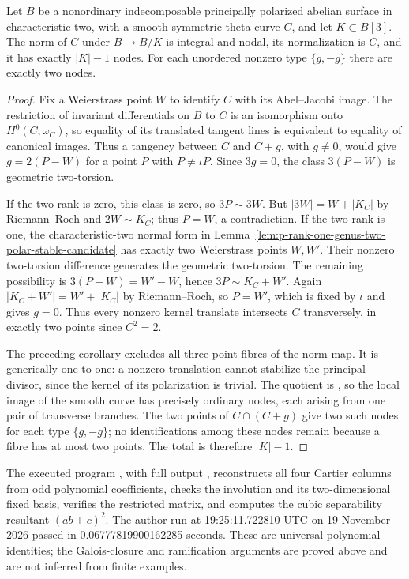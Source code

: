 \begin{corollary}
\label{cor:nonordinary-theta-three-torsion-nodal-norm-candidate}
Let $B$ be a nonordinary indecomposable principally polarized
abelian surface in characteristic two, with a smooth symmetric
theta curve $C$, and let $K\subset B[3]$. The norm of $C$ under
$B\to B/K$ is integral and nodal, its normalization is $C$,
and it has exactly $|K|-1$ nodes. For each unordered nonzero type
$\{g,-g\}$ there are exactly two nodes.
\end{corollary}
\begin{proof}
Fix a Weierstrass point $W$ to identify $C$ with its Abel--Jacobi
image. The restriction of invariant differentials on $B$ to $C$
is an isomorphism onto $H^0(C,\omega_C)$, so equality of its
translated tangent lines is equivalent to equality of canonical
images. Thus a tangency between $C$ and $C+g$, with $g\ne0$,
would give $g=2(P-W)$ for a point $P$ with $P\ne\iota P$.
Since $3g=0$, the class $3(P-W)$ is geometric two-torsion.

If the two-rank is zero, this class is zero, so $3P\sim3W$.
But $|3W|=W+|K_C|$ by Riemann--Roch and $2W\sim K_C$;
thus $P=W$, a contradiction. If the two-rank is one, the
characteristic-two normal form in
Lemma~\ref{lem:p-rank-one-genus-two-polar-stable-candidate}
has exactly two Weierstrass points $W,W'$. Their nonzero
two-torsion difference generates the geometric two-torsion.
The remaining possibility is $3(P-W)=W'-W$, hence
$3P\sim K_C+W'$. Again $|K_C+W'|=W'+|K_C|$ by
Riemann--Roch, so $P=W'$, which is fixed by $\iota$ and gives
$g=0$. Thus every nonzero kernel translate intersects $C$
transversely, in exactly two points since $C^2=2$.

The preceding corollary excludes all three-point fibres of the
norm map. It is generically one-to-one: a nonzero translation
cannot stabilize the principal divisor, since the kernel of its
polarization is trivial. The quotient is \etale, so the local
image of the smooth curve has precisely ordinary nodes, each
arising from one pair of transverse branches. The two points of
$C\cap(C+g)$ give two such nodes for each type $\{g,-g\}$;
no identifications among these nodes remain because a fibre has
at most two points. The total is therefore $|K|-1$.
\end{proof}

\begin{remark}
\label{rem:three-total-ramification-Cartier-certificate-candidate}
The executed program
,
with full output
,
reconstructs all four Cartier columns from odd polynomial coefficients,
checks the involution and its two-dimensional fixed basis, verifies
the restricted matrix, and computes the cubic separability resultant
$(ab+c)^2$. The author run at 19:25:11.722810 UTC on 19 November
2026 passed in 0.06777819900162285 seconds. These are universal
polynomial identities; the Galois-closure and ramification arguments
are proved above and are not inferred from finite examples.
\end{remark}

